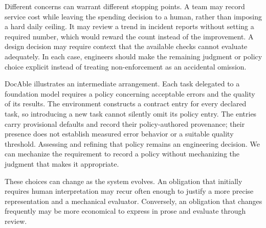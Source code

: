 Different concerns can warrant different stopping points. A team may record service cost while leaving the spending decision to a human, rather than imposing a hard daily ceiling. It may review a trend in incident reports without setting a required number, which would reward the count instead of the improvement. A design decision may require context that the available checks cannot evaluate adequately. In each case, engineers should make the remaining judgment or policy choice explicit instead of treating non-enforcement as an accidental omission.

DocAble illustrates an intermediate arrangement. Each task delegated to a foundation model requires a policy concerning acceptable errors and the quality of its results. The environment constructs a contract entry for every declared task, so introducing a new task cannot silently omit its policy entry. The entries carry provisional defaults and record their policy-authored provenance; their presence does not establish measured error behavior or a suitable quality threshold. Assessing and refining that policy remains an engineering decision. We can mechanize the requirement to record a policy without mechanizing the judgment that makes it appropriate.

These choices can change as the system evolves. An obligation that initially requires human interpretation may recur often enough to justify a more precise representation and a mechanical evaluator. Conversely, an obligation that changes frequently may be more economical to express in prose and evaluate through review.
